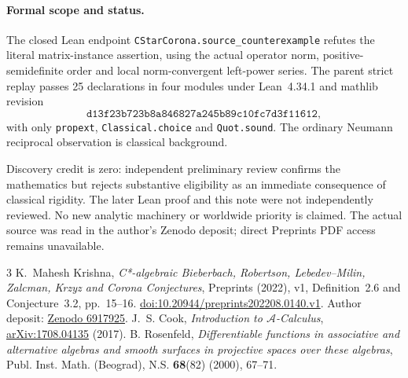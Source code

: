 \documentclass[11pt]{article}
\begin{document}
\paragraph{Formal scope and status.}
The closed Lean endpoint \texttt{CStarCorona.source\_counterexample}
refutes the literal matrix-instance assertion, using the actual operator norm,
positive-semidefinite order and local norm-convergent left-power series.
The parent strict replay passes 25 declarations in four modules under
Lean~4.34.1 and mathlib revision
\[\texttt{d13f23b723b8a846827a245b89c10fc7d3f11612},\]
with only \texttt{propext}, \texttt{Classical.choice} and \texttt{Quot.sound}.
The ordinary Neumann reciprocal observation is classical background.

Discovery credit is zero: independent preliminary review confirms the
mathematics but rejects substantive eligibility as an immediate consequence
of classical rigidity. The later Lean proof and this note were not
independently reviewed. No new analytic machinery or worldwide priority is
claimed. The actual source was read in the author's Zenodo deposit;
direct Preprints PDF access remains unavailable.

\begin{thebibliography}{3}
 K.~Mahesh Krishna,
\emph{C*-algebraic Bieberbach, Robertson, Lebedev--Milin, Zalcman, Krzyz and
Corona Conjectures}, Preprints (2022), v1, Definition~2.6 and Conjecture~3.2,
pp.~15--16. \href{https://doi.org/10.20944/preprints202208.0140.v1}{doi:10.20944/preprints202208.0140.v1}.
Author deposit: \href{https://doi.org/10.5281/zenodo.6917925}{Zenodo 6917925}.
 J.~S. Cook,
\emph{Introduction to $\mathcal A$-Calculus},
\href{https://arxiv.org/abs/1708.04135}{arXiv:1708.04135} (2017).
 B. Rosenfeld,
\emph{Differentiable functions in associative and alternative algebras and
smooth surfaces in projective spaces over these algebras},
Publ. Inst. Math. (Beograd), N.S. \textbf{68}(82) (2000), 67--71.
\end{thebibliography}
\end{document}
